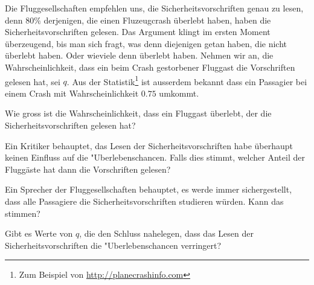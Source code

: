 Die Fluggesellschaften empfehlen uns, die Sicherheitsvorschriften
genau zu lesen, denn $80\%$ derjenigen, die einen Fluzeugcrash
überlebt haben, haben die Sicherheitsvorschriften gelesen.
Das Argument klingt im ersten Moment überzeugend, bis man
sich fragt, was denn diejenigen getan haben, die nicht
überlebt haben. Oder wieviele denn überlebt haben.
Nehmen wir an, die Wahrscheinlichkeit, dass ein
beim Crash gestorbener Fluggast die Vorschriften gelesen hat, sei
$q$.
Aus der Statistik\footnote{Zum Beispiel von \url{http://planecrashinfo.com}}
ist ausserdem bekannt dass ein Passagier bei einem Crash
mit Wahrscheinlichkeit $0.75$ umkommt.
\begin{teilaufgaben}
\item
Wie gross ist die Wahrscheinlichkeit, dass ein Fluggast überlebt, der die
Sicherheitsvorschriften gelesen hat?
\item
Ein Kritiker behauptet, das Lesen der Sicherheitsvorschriften
habe überhaupt keinen Einfluss auf die "Uberlebenschancen.
Falls dies stimmt, welcher Anteil der Fluggäste hat dann die
Vorschriften gelesen?
\item
Ein Sprecher der Fluggesellschaften behauptet, es werde immer sichergestellt,
dass alle Passagiere die Sicherheitsvorschriften studieren würden.
Kann das stimmen?
\item
Gibt es Werte von $q$, die den Schluss nahelegen,
dass das Lesen der Sicherheitsvorschriften
die "Uberlebenschancen verringert?
\end{teilaufgaben}


